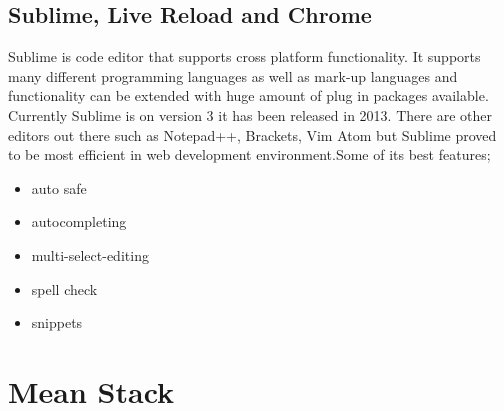 \subsection{Sublime, Live Reload and Chrome}
\bigbreak
Sublime is code editor that supports cross platform functionality. It supports many different programming languages as well as mark-up languages and functionality can be extended with huge amount of plug in packages available. Currently Sublime is on version 3 it has been released in 2013.
There are other editors out there such as Notepad++, Brackets, Vim Atom but Sublime proved to be most efficient in web development environment.Some of its best features;

\begin{itemize}
	
	\item auto safe 
	\item autocompleting 
	\item multi-select-editing 
	\item spell check 
	\item snippets  

\end{itemize}





\section{Mean Stack}
